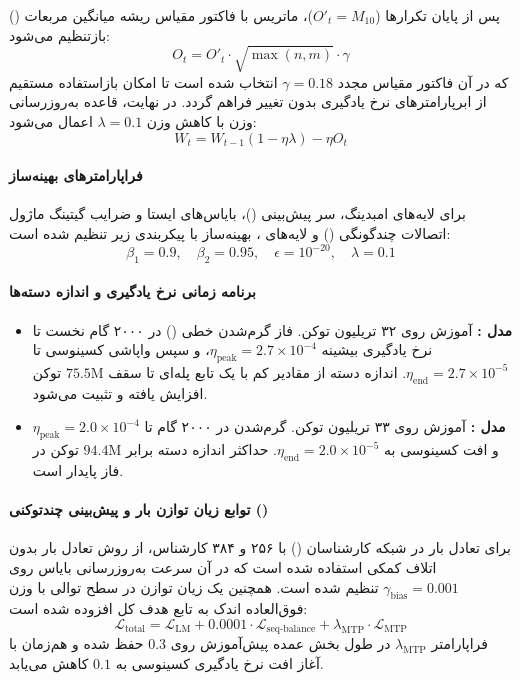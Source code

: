 پس از پایان تکرارها ($O'_t = M_{10}$)، ماتریس با فاکتور مقیاس ریشه میانگین مربعات () بازتنظیم می‌شود:
\begin{equation}
    O_t = O'_t \cdot \sqrt{\max(n, m)} \cdot \gamma
\end{equation}
که در آن فاکتور مقیاس مجدد $\gamma = 0.18$ انتخاب شده است تا امکان بازاستفاده مستقیم از ابرپارامترهای نرخ یادگیری  بدون تغییر فراهم گردد. در نهایت، قاعده به‌روزرسانی وزن با کاهش وزن $\lambda = 0.1$ اعمال می‌شود:
\begin{equation}
    W_t = W_{t-1} (1 - \eta \lambda) - \eta O_t
\end{equation}

\paragraph*{فراپارامترهای بهینه‌ساز }
برای لایه‌های امبدینگ، سر پیش‌بینی ()، بایاس‌های ایستا و ضرایب گیتینگ ماژول اتصالات چندگونگی () و لایه‌های ، بهینه‌ساز  با پیکربندی زیر تنظیم شده است:
\begin{equation}
    \beta_1 = 0.9, \quad \beta_2 = 0.95, \quad \epsilon = 10^{-20}, \quad \lambda = 0.1
\end{equation}

\paragraph*{برنامه زمانی نرخ یادگیری و اندازه دسته‌ها}
\begin{itemize}
    \item \textbf{مدل :} آموزش روی ۳۲ تریلیون توکن. فاز گرم‌شدن خطی () در ۲۰۰۰ گام نخست تا نرخ یادگیری بیشینه $\eta_{\text{peak}} = 2.7 \times 10^{-4}$، و سپس واپاشی کسینوسی تا $\eta_{\text{end}} = 2.7 \times 10^{-5}$. اندازه دسته از مقادیر کم با یک تابع پله‌ای تا سقف $75.5\text{M}$ توکن افزایش یافته و تثبیت می‌شود.
    \item \textbf{مدل :} آموزش روی ۳۳ تریلیون توکن. گرم‌شدن در ۲۰۰۰ گام تا $\eta_{\text{peak}} = 2.0 \times 10^{-4}$ و افت کسینوسی به $\eta_{\text{end}} = 2.0 \times 10^{-5}$. حداکثر اندازه دسته برابر $94.4\text{M}$ توکن در فاز پایدار است.
\end{itemize}

\paragraph*{توابع زیان توازن بار و پیش‌بینی چندتوکنی ()}
برای تعادل بار در شبکه کارشناسان () با ۲۵۶ و ۳۸۴ کارشناس، از روش تعادل بار بدون اتلاف کمکی استفاده شده است که در آن سرعت به‌روزرسانی بایاس روی $\gamma_{\text{bias}} = 0.001$ تنظیم شده است. همچنین یک زیان توازن در سطح توالی با وزن فوق‌العاده اندک به تابع هدف کل افزوده شده است:
\begin{equation}
    \mathcal{L}_{\text{total}} = \mathcal{L}_{\text{LM}} + 0.0001 \cdot \mathcal{L}_{\text{seq-balance}} + \lambda_{\text{MTP}} \cdot \mathcal{L}_{\text{MTP}}
\end{equation}
فراپارامتر $\lambda_{\text{MTP}}$ در طول بخش عمده پیش‌آموزش روی $0.3$ حفظ شده و هم‌زمان با آغاز افت نرخ یادگیری کسینوسی به $0.1$ کاهش می‌یابد.

